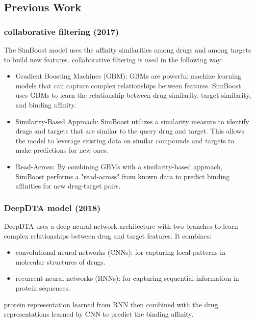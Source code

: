 \documentclass[11pt, a4paper]{article}
\begin{document}
        \subsection{Previous Work}
            \subsubsection{collaborative filtering (2017) \cite{8}} 
                The SimBoost model uses the affinity similarities among drugs and among targets to build new features.
                collaborative filtering is used in the following way:
                \begin{itemize}
                    \item Gradient Boosting Machines (GBM): 
                    GBMs are powerful machine learning models that can capture complex relationships between features. SimBoost uses GBMs to learn the relationship between drug similarity, target similarity, and binding affinity.
                    \item Similarity-Based Approach: 
                    SimBoost utilizes a similarity measure to identify drugs and targets that are similar to the query drug and target. This allows the model to leverage existing data on similar compounds and targets to make predictions for new ones.
                    \item Read-Across: 
                    By combining GBMs with a similarity-based approach, SimBoost performs a "read-across" from known data to predict binding affinities for new drug-target pairs.
                \end{itemize}
            \subsubsection{DeepDTA model (2018) \cite{9}}
                DeepDTA uses a deep neural network architecture with two branches to learn complex relationships between drug and target features. It combines:
                \begin{itemize}
                    \item convolutional neural networks (CNNs):
                         for capturing local patterns in molecular structures of drugs.
                    \item recurrent neural networks (RNNs):
                         for capturing sequential information in protein sequences.
                \end{itemize}
                protein representation learned from RNN then combined with the drug representations learned by CNN to predict the binding affinity.
\end{document}
